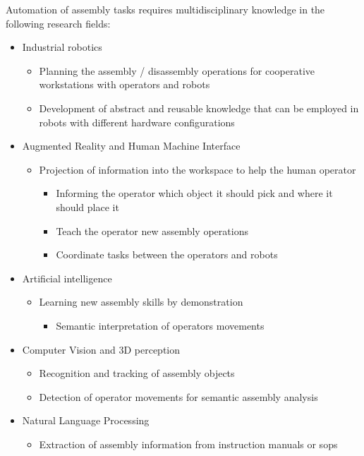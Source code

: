Automation of assembly tasks requires multidisciplinary knowledge in the following research fields:

\begin{itemize}
	\item Industrial robotics
	\begin{itemize}
		\item Planning the assembly / disassembly operations for cooperative workstations with operators and robots
		\item Development of abstract and reusable knowledge that can be employed in robots with different hardware configurations
	\end{itemize}

	\item Augmented Reality and Human Machine Interface
	\begin{itemize}
		\item Projection of information into the workspace to help the human operator
		\begin{itemize}
			\item Informing the operator which object it should pick and where it should place it
			\item Teach the operator new assembly operations
			\item Coordinate tasks between the operators and robots
		\end{itemize}
	\end{itemize}

	\item Artificial intelligence
	\begin{itemize}
		\item Learning new assembly skills by demonstration
		\begin{itemize}
			\item Semantic interpretation of operators movements
		\end{itemize}
	\end{itemize}

	\item Computer Vision and 3D perception
	\begin{itemize}
		\item Recognition and tracking of assembly objects
		\item Detection of operator movements for semantic assembly analysis
	\end{itemize}

	\item Natural Language Processing
	\begin{itemize}
		\item Extraction of assembly information from instruction manuals or \glspl{sop}
	\end{itemize}
\end{itemize}



